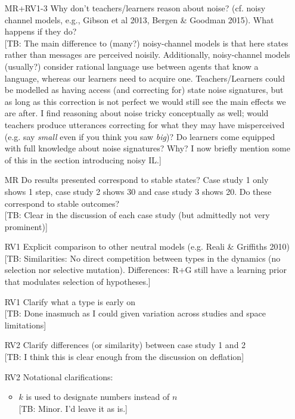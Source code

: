 \documentclass[10pt,a4paper]{article}
\newcommand{\tb}[1]{\textcolor[rgb]{.8,.33,.0}{[TB: #1]}}%
\begin{document}
  \begin{itemize}
    \item [MR+RV1-3] Why don't teachers/learners reason about noise? (cf. noisy channel models, e.g., Gibson et al 2013, Bergen \& Goodman 2015). What happens if they do?\\ \tb{The main difference to (many?) noisy-channel models is that here states rather than messages are perceived noisily. Additionally, noisy-channel models (usually?) consider rational language use between agents that know a language, whereas our learners need to acquire one. Teachers/Learners could be modelled as having access (and correcting for) state noise signatures, but as long as this correction is not perfect we would still see the main effects we are after. I find reasoning about noise tricky conceptually as well; would teachers produce utterances correcting for what they may have misperceived (e.g. say {\em small} even if you think you saw {\em big})? Do learners come equipped with full knowledge about noise signatures? Why? I now briefly mention some of this in the section introducing noisy IL.} 
    \item [MR] Do results presented correspond to stable states? Case study 1 only shows 1 step, case study 2 shows 30 and case study 3 shows 20. Do these correspond to stable outcomes?\\ \tb{Clear in the discussion of each case study (but admittedly not very prominent)}
    \item [RV1] Explicit comparison to other neutral models (e.g. Reali \& Griffiths 2010)\\ \tb{Similarities: No direct competition between types in the dynamics (no selection nor selective mutation). Differences: R+G still have a learning prior that modulates selection of hypotheses.} 
    \item [RV1] Clarify what a type is early on\\ \tb{Done inasmuch as I could given variation across studies and space limitations}
    \item [RV2] Clarify differences (or similarity) between case study 1 and 2\\\tb{I think this is clear enough from the discussion on deflation}
    \item [RV2] Notational clarifications:
      \begin{itemize}
	\item $k$ is used to designate numbers instead of $n$\\ \tb{Minor. I'd leave it as is.}

\end{itemize}
\end{itemize}
\end{document}
